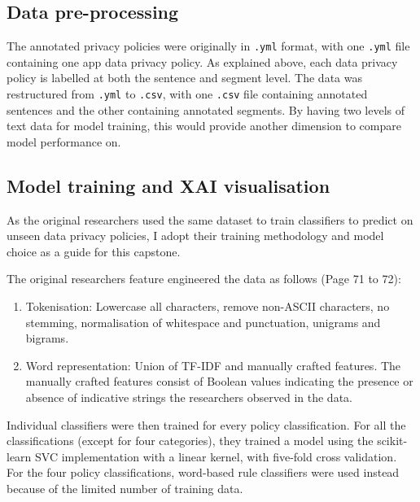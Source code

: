 \subsection{Data pre-processing}
The annotated privacy policies were originally in \texttt{.yml} format, with one \texttt{.yml} file containing one app data privacy policy. As explained above, each data privacy policy is labelled at both the sentence and segment level. The data was restructured from \texttt{.yml} to \texttt{.csv}, with one \texttt{.csv} file containing annotated sentences and the other containing annotated segments. By having two levels of text data for model training, this would provide another dimension to compare model performance on.


\subsection{Model training and XAI visualisation}

As the original researchers used the same dataset to train classifiers to predict on unseen data privacy policies, I adopt their training methodology and model choice as a guide for this capstone. 

The original researchers feature engineered the data as follows (Page 71 to 72): 

\begin{enumerate}
	\item Tokenisation: Lowercase all characters, remove non-ASCII characters, no stemming, normalisation of whitespace and punctuation, unigrams and bigrams.
	\item Word representation: Union of TF-IDF and manually crafted features. The manually crafted features consist of Boolean values indicating the presence or absence of indicative strings the researchers observed in the data.
\end{enumerate}

Individual classifiers were then trained for every policy classification. For all the classifications (except for four categories), they trained a model using the scikit-learn SVC implementation with a linear kernel, with five-fold cross validation. For the four policy classifications, word-based rule classifiers were used instead because of the limited number of training data.

